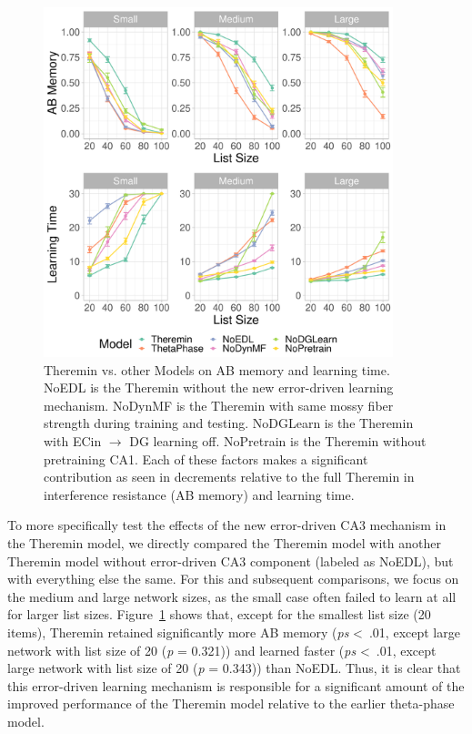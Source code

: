 \documentclass[11pt,twoside]{article}
\newif\myifpdf
\begin{document}
\begin{figure}
  \centering\includegraphics[width=4in]{fig_hip_edl_mods}
  \caption{\footnotesize Theremin vs. other Models on AB memory and learning time. NoEDL is the Theremin without the new error-driven learning mechanism. NoDynMF is the Theremin with same mossy fiber strength during training and testing. NoDGLearn is the Theremin with ECin $\rightarrow$ DG learning off. NoPretrain is the Theremin without pretraining CA1. Each of these factors makes a significant contribution as seen in decrements relative to the full Theremin in interference resistance (AB memory) and learning time.}
\label{fig.mods}
\end{figure}

To more specifically test the effects of the new error-driven CA3 mechanism in the Theremin model, we directly compared the Theremin model with another Theremin model without error-driven CA3 component (labeled as NoEDL), but with everything else the same. For this and subsequent comparisons, we focus on the medium and large network sizes, as the small case often failed to learn at all for larger list sizes.  Figure~\ref{fig.mods} shows that, except for the smallest list size (20 items), Theremin retained significantly more AB memory (\emph{ps} \textless \ .01, except large network with list size of 20 (\emph{p} = 0.321)) and learned faster (\emph{ps} \textless \ .01, except large network with list size of 20 (\emph{p} = 0.343)) than NoEDL.  Thus, it is clear that this error-driven learning mechanism is responsible for a significant amount of the improved performance of the Theremin model relative to the earlier theta-phase model.
\end{document}
